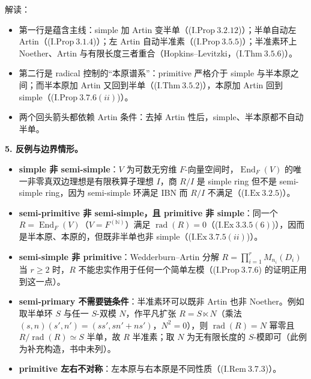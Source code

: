 \documentclass[a4paper]{ctexart}
\theoremstyle{definition}
\theoremstyle{analysis}
\theoremstyle{plain}
\begin{document}
解读：

\begin{itemize}
  \item 第一行是蕴含主线：simple 加 Artin 变半单（(\(\mathrm{I.Prop}\ 3.2.12\))）；半单自动左 Artin（(\(\mathrm{I.Prop}\ 3.1.4\))）；左 Artin 自动半准素（(\(\mathrm{I.Prop}\ 3.5.5\))）；半准素环上 Noether、Artin 与有限长度三者重合（Hopkins--Levitzki，(\(\mathrm{I.Thm}\ 3.5.6\))）。
  \item 第二行是 radical 控制的“本原谱系”：primitive 严格介于 simple 与半本原之间；而半本原加 Artin 又回到半单（(\(\mathrm{I.Thm}\ 3.5.2\))），本原加 Artin 回到 simple（(\(\mathrm{I.Prop}\ 3.7.6(ii)\))）。
  \item 两个回头箭头都依赖 Artin 条件：去掉 Artin 性后，simple、半本原都不自动半单。
\end{itemize}

\medskip

\textbf{5. 反例与边界情形。}

\begin{itemize}
  \item \textbf{simple 非 semi-simple}：\(V\) 为可数无穷维 \(F\)-向量空间时，\(\operatorname{End}_F(V)\) 的唯一非零真双边理想是有限秩算子理想 \(I\)，商 \(R/I\) 是 simple ring 但不是 semi-simple ring，因为 semi-simple 环满足 IBN 而 \(R/I\) 不满足（(\(\mathrm{I.Ex}\ 3.2.5\))）。
  \item \textbf{semi-primitive 非 semi-simple，且 primitive 非 simple}：同一个 \(R=\operatorname{End}_F(V)\)（\(V=F^{(\mathbb N)}\)）满足 \(\operatorname{rad}(R)=0\)（(\(\mathrm{I.Ex}\ 3.3.5(6)\))），因而是半本原、本原的，但既非半单也非 simple（(\(\mathrm{I.Ex}\ 3.7.5(ii)\))）。
  \item \textbf{semi-simple 非 primitive}：Wedderburn--Artin 分解 \(R=\prod_{i=1}^r M_{n_i}(D_i)\) 当 \(r\ge 2\) 时，\(R\) 不能忠实作用于任何一个简单左模（(\(\mathrm{I.Prop}\ 3.7.6\)) 的证明正用到这一点）。
  \item \textbf{semi-primary 不需要链条件}：半准素环可以既非 Artin 也非 Noether。例如取半单环 \(S\) 与任一 \(S\)-双模 \(N\)，作平凡扩张 \(R=S\ltimes N\)（乘法 \((s,n)(s',n')=(ss',sn'+ns')\)，\(N^2=0\)），则 \(\operatorname{rad}(R)=N\) 幂零且 \(R/\operatorname{rad}(R)\simeq S\) 半单，故 \(R\) 半准素；取 \(N\) 为无有限长度的 \(S\)-模即可（此例为补充构造，书中未列）。
  \item \textbf{primitive 左右不对称}：左本原与右本原是不同性质（(\(\mathrm{I.Rem}\ 3.7.3\))）。
\end{itemize}

\medskip
\end{document}
